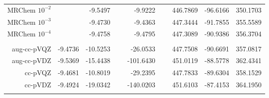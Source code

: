 \documentclass[a0,draft,portrait]{a0poster}
\begin{document}
\begin{textblock}{7}
\begin{table}
\begin{tabular}{|r|crr|ccc|}
	MRChem $10^{-2}$ &               &  -9.5497\ \ \ &  -9.9222\ \ \ &  446.7869     &  -96.6166     &  350.1703     \\
	MRChem $10^{-3}$ &               &  -9.4730\ \ \ &  -9.4363\ \ \ &  447.3444     &  -91.7855     &  355.5589     \\
	MRChem $10^{-4}$ &               &  -9.4758\ \ \ &  -9.4795\ \ \ &  447.3089     &  -90.9386     &  356.3704     \\
	                 &               &               &               &               &               &               \\
	aug-cc-pVQZ      & -9.4736       & -10.5253\ \ \ & -26.0533\ \ \ &  447.7508     &  -90.6691     &  357.0817     \\
	aug-cc-pVDZ      & -9.5369       & -15.4438\ \ \ &-101.6430\ \ \ &  451.0119     &  -88.5778     &  362.4341     \\
	    cc-pVQZ      & -9.4681       & -10.8019\ \ \ & -29.2395\ \ \ &  447.7833     &  -89.6304     &  358.1529     \\
	    cc-pVDZ      & -9.4924       & -19.0342\ \ \ &-140.0203\ \ \ &  451.6103     &  -87.4153     &  364.1950     \\
	                 &               &               &               &               &               &               \\
	\hline
	\end{tabular}
    \end{table}
\end{textblock}
\end{document}
